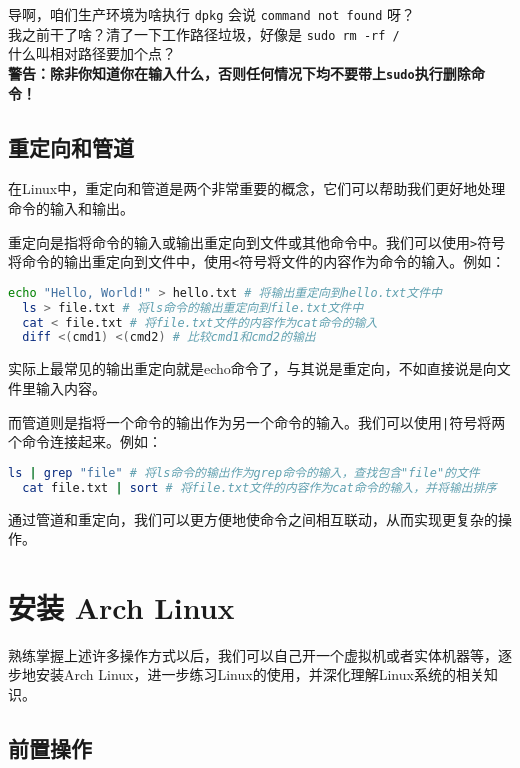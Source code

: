 \documentclass[../main.tex]{subfiles}
\begin{document}
\begin{tcolorbox}[title=笑话]
  导啊，咱们生产环境为啥执行 \texttt{dpkg} 会说 \texttt{command not found} 呀？\\
  我之前干了啥？清了一下工作路径垃圾，好像是 \texttt{sudo rm -rf /}\\
  什么叫相对路径要加个点？\\
  {\color{red}\textbf{警告：除非你知道你在输入什么，否则任何情况下均不要带上\texttt{sudo}执行删除命令！}}
\end{tcolorbox}

\subsection{重定向和管道}

在Linux中，重定向和管道是两个非常重要的概念，它们可以帮助我们更好地处理命令的输入和输出。

重定向是指将命令的输入或输出重定向到文件或其他命令中。我们可以使用\texttt{>}符号将命令的输出重定向到文件中，使用\texttt{<}符号将文件的内容作为命令的输入。例如：
\begin{lstlisting}[language=bash]
  echo "Hello, World!" > hello.txt # 将输出重定向到hello.txt文件中
  ls > file.txt # 将ls命令的输出重定向到file.txt文件中
  cat < file.txt # 将file.txt文件的内容作为cat命令的输入
  diff <(cmd1) <(cmd2) # 比较cmd1和cmd2的输出
\end{lstlisting}
实际上最常见的输出重定向就是echo命令了，与其说是重定向，不如直接说是向文件里输入内容。

而管道则是指将一个命令的输出作为另一个命令的输入。我们可以使用\texttt{|}符号将两个命令连接起来。例如：
\begin{lstlisting}[language=bash]
  ls | grep "file" # 将ls命令的输出作为grep命令的输入，查找包含"file"的文件
  cat file.txt | sort # 将file.txt文件的内容作为cat命令的输入，并将输出排序
\end{lstlisting}

通过管道和重定向，我们可以更方便地使命令之间相互联动，从而实现更复杂的操作。

\section{安装 Arch Linux}

熟练掌握上述许多操作方式以后，我们可以自己开一个虚拟机或者实体机器等，逐步地安装Arch Linux，进一步练习Linux的使用，并深化理解Linux系统的相关知识。

\subsection{前置操作}
\end{document}
